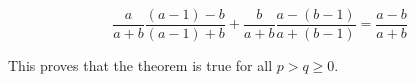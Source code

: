 

\begin{equation*}
	\frac{a}{a+b} \frac{(a-1)-b}{(a-1)+b} + \frac{b}{a+b} \frac{a-(b-1)}{a+(b-1)} = \frac{a-b}{a+b}
\end{equation*}

This proves that the theorem is true for all $p>q\ge0$.



